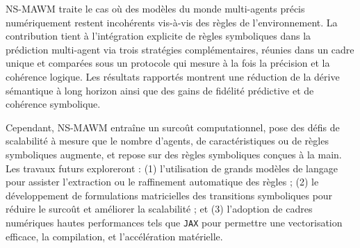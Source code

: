 \documentclass[final]{jfsma}
\theoremstyle{plain}
\theoremstyle{definition}
\theoremstyle{remark}
\begin{document}
NS-MAWM traite le cas où des modèles du monde multi-agents précis numériquement restent incohérents vis-à-vis des règles de l'environnement. La contribution tient à l'intégration explicite de règles symboliques dans la prédiction multi-agent via trois stratégies complémentaires, réunies dans un cadre unique et comparées sous un protocole qui mesure à la fois la précision et la cohérence logique. Les résultats rapportés montrent une réduction de la dérive sémantique à long horizon ainsi que des gains de fidélité prédictive et de cohérence symbolique.

Cependant, NS-MAWM entraîne un surcoût computationnel,
pose des défis de scalabilité à mesure que le nombre d'agents, de caractéristiques ou de règles symboliques augmente,
et repose sur des règles symboliques conçues à la main.
Les travaux futurs exploreront :
(1) l'utilisation de grands modèles de langage pour assister l'extraction ou le raffinement automatique des règles ;
(2) le développement de formulations matricielles des transitions symboliques pour réduire le surcoût et améliorer la scalabilité ;
et (3) l'adoption de cadres numériques hautes performances tels que \texttt{JAX}
pour permettre une vectorisation efficace, la compilation, et l'accélération matérielle.




\renewcommand{\bibname}{}

\begin{myCustomSize}
  \printbibliography
\end{myCustomSize}
\end{document}
